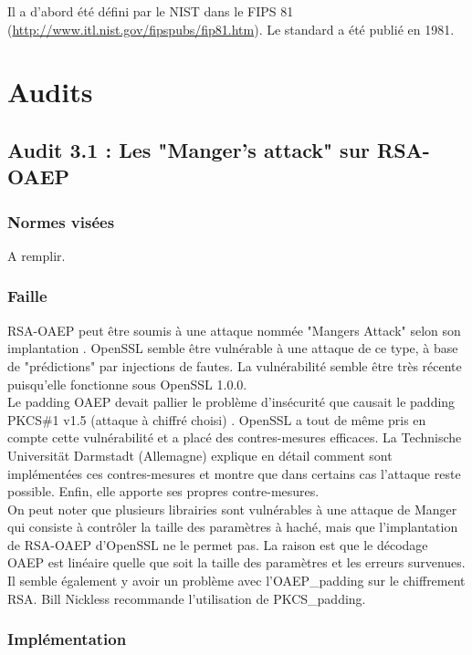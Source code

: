 Il a d'abord été défini par le NIST dans le FIPS 81 (\url{http://www.itl.nist.gov/fipspubs/fip81.htm}). Le standard a été publié en 1981.


\section{Audits}
\subsection{Audit 3.1 : Les "Manger's attack" sur RSA-OAEP}
\subsubsection{Normes visées}

A remplir.

\subsubsection{Faille}

RSA-OAEP peut être soumis à une attaque nommée "Mangers Attack" selon son implantation \cite{mangers2010falko}. OpenSSL semble être vulnérable à une attaque de ce type, à base de "prédictions" par injections de fautes. La vulnérabilité semble être très récente puisqu'elle fonctionne sous OpenSSL 1.0.0.\\


Le padding OAEP devait pallier le problème d'insécurité que causait le padding PKCS\#1 v1.5 (attaque à chiffré choisi) \cite{bleichenbacherPCKS}. OpenSSL a tout de même pris en compte cette vulnérabilité et a placé des contres-mesures efficaces. La Technische Universität Darmstadt (Allemagne) explique en détail comment sont implémentées ces contres-mesures et montre que dans certains cas l'attaque reste possible. Enfin, elle apporte ses propres contre-mesures.\\

On peut noter que plusieurs librairies sont vulnérables à une attaque de Manger qui consiste à contrôler la taille des paramètres à haché, mais que l'implantation de RSA-OAEP d'OpenSSL ne le permet pas. La raison est que le décodage OAEP est linéaire quelle que soit la taille des paramètres et les erreurs survenues. Il semble également y avoir un problème avec l'OAEP\_padding sur le chiffrement RSA. Bill Nickless recommande l'utilisation de PKCS\_padding. \cite{sourceforgeRSAbroken}	\\


\subsubsection{Implémentation}

